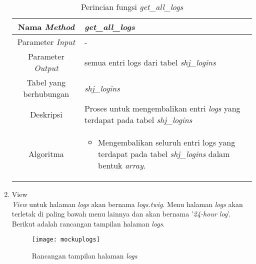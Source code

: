 \begin{enumerate}
	\begin{table}[H]
		\caption{Perincian fungsi \textit{get\_all\_logs}}
		\begin{tabular}{|c|p{11cm}|}
			\hline
			Nama \textit{Method} 	& 	\textit{get\_all\_logs} 	\\
			\hline
			Parameter \textit{Input} & - \\
			\hline
			Parameter \textit{Output} &  semua entri logs dari tabel \textit{shj\_logins}\\
			\hline
			Tabel yang berhubungan & \textit{shj\_logins} \\
			\hline
			Deskripsi	& Proses untuk mengembalikan entri \textit{logs} yang terdapat pada tabel \textit{shj\_logins} \\
			\hline
			Algoritma	& \begin{itemize}
				\item Mengembalikan seluruh entri logs yang terdapat pada tabel \textit{shj\_logins} dalam bentuk \textit{array}.
			\end{itemize} \\
			\hline
		\end{tabular}
	\end{table}

	\item View \\
	\textit{View} untuk halaman \textit{logs} akan bernama \textit{logs.twig}. Menu halaman \textit{logs} akan terletak di paling bawah menu lainnya dan akan bernama '\textit{24-hour log}'. Berikut adalah rancangan tampilan halaman \textit{logs}.
	
	\begin{figure}[H]
		\centering  
		\texttt{[image: mockuplogs]}  
		\caption[Rancangan tampilan halaman \textit{logs}]{Rancangan tampilan halaman \textit{logs}} 
		\label{fig:mockuplogs} 
	\end{figure}


\end{enumerate}
